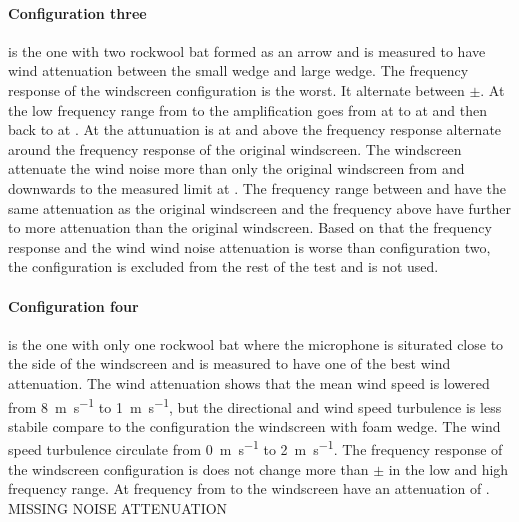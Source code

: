 \paragraph{Configuration three} is the one with two rockwool bat formed as an arrow and is measured to have wind attenuation between the small wedge and large wedge. The frequency response of the windscreen configuration is the worst. It alternate between $\pm$. At the low frequency range from  to  the amplification goes from  at  to  at  and then back to   at . At   the attunuation is at  and above the frequency response alternate around the frequency response of the original windscreen. The windscreen attenuate the wind noise  more than only the original windscreen from  and downwards to the measured limit at . The frequency range between  and  have the same attenuation as the original windscreen and the frequency above have further  to  more attenuation than the original windscreen. Based on that the frequency response and the wind wind noise attenuation is worse than configuration two, the configuration is excluded from the rest of the test and is not used.

\paragraph{Configuration four} is the one with only one rockwool bat where the microphone is siturated close to the side of the windscreen and is measured to have one of the best wind attenuation. The wind attenuation shows that the mean wind speed is lowered from \SI{8}{\meter\per\second} to \SI{1}{\meter\per\second}, but the directional and wind speed turbulence is less stabile compare to the configuration the windscreen with foam wedge. The wind speed turbulence circulate from \SI{0}{\meter\per\second} to \SI{2}{\meter\per\second}. The frequency response of the windscreen configuration is does not change more than $\pm$ in the low and high frequency range. At frequency from  to  the windscreen have an attenuation of . MISSING NOISE ATTENUATION




